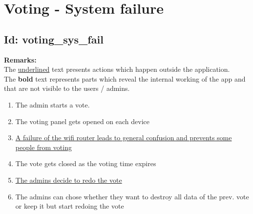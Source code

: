 \documentclass{article}
\begin{document}
\section*{Voting - System failure}
\subsection*{Id: voting\_sys\_fail}
\noindent
\textbf{Remarks:}\\
 The \underline{underlined} text presents actions which happen outside the application. \\
 The \textbf{bold} text represents parts which reveal the internal working of the app and that are not visible to the users / admins.
\begin{enumerate}
	\item The admin starts a vote.
	\item The voting panel gets opened on each device
	\item \underline{A failure of the wifi router leads to general confusion and prevents some people from voting}
	\item The vote gets closed as the voting time expires
	\item \underline{The admins decide to redo the vote}
	\item The admins can chose whether they want to destroy all data of the prev. vote or keep it but start redoing the vote
\end{enumerate}
\end{document}
